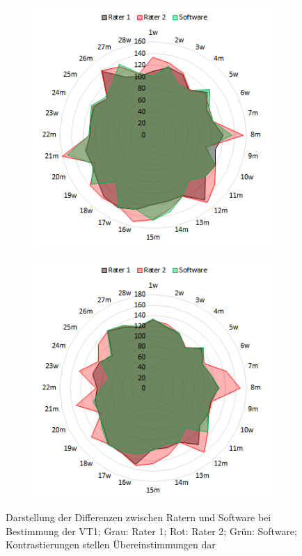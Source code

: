 %
\begin{figure}[H]
	\centering
	\begin{subfigure}[c]{0.45\textwidth}
		\centering
		\includegraphics[scale=0.7]{Bilder/v-slope_net}
			\label{subpic:pic1}
	\end{subfigure}%
	\hfil
	\begin{subfigure}[c]{0.45\textwidth}
		\centering
		\includegraphics[scale=0.7]{Bilder/eqo2_net}
			\label{subpic:pic2}
	\end{subfigure}
\caption[Grafische Darstellung der Differenzen für die VT1]{Darstellung der Differenzen zwischen Ratern und Software bei Bestimmung der VT1; Grau: Rater 1; Rot: Rater 2; Grün: Software; Kontrastierungen stellen Übereinstimmungen dar}
\label{pic:pic22}
\end{figure}
